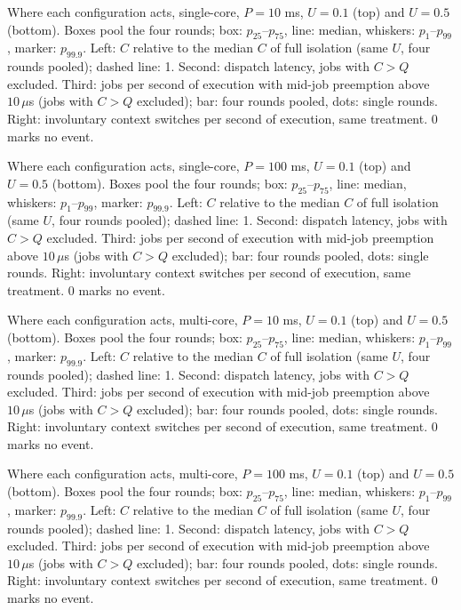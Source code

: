 \caption{Where each configuration acts, single-core, $P = 10$ ms, $U = 0.1$ (top) and $U = 0.5$ (bottom). Boxes pool the four rounds; box: $p_{25}$--$p_{75}$, line: median, whiskers: $p_1$--$p_{99}$, marker: $p_{99.9}$. Left: $C$ relative to the median $C$ of full isolation (same $U$, four rounds pooled); dashed line: 1. Second: dispatch latency, jobs with $C > Q$ excluded. Third: jobs per second of execution with mid-job preemption above $10\,\mu$s (jobs with $C > Q$ excluded); bar: four rounds pooled, dots: single rounds. Right: involuntary context switches per second of execution, same treatment. 0 marks no event.}

\caption{Where each configuration acts, single-core, $P = 100$ ms, $U = 0.1$ (top) and $U = 0.5$ (bottom). Boxes pool the four rounds; box: $p_{25}$--$p_{75}$, line: median, whiskers: $p_1$--$p_{99}$, marker: $p_{99.9}$. Left: $C$ relative to the median $C$ of full isolation (same $U$, four rounds pooled); dashed line: 1. Second: dispatch latency, jobs with $C > Q$ excluded. Third: jobs per second of execution with mid-job preemption above $10\,\mu$s (jobs with $C > Q$ excluded); bar: four rounds pooled, dots: single rounds. Right: involuntary context switches per second of execution, same treatment. 0 marks no event.}

\caption{Where each configuration acts, multi-core, $P = 10$ ms, $U = 0.1$ (top) and $U = 0.5$ (bottom). Boxes pool the four rounds; box: $p_{25}$--$p_{75}$, line: median, whiskers: $p_1$--$p_{99}$, marker: $p_{99.9}$. Left: $C$ relative to the median $C$ of full isolation (same $U$, four rounds pooled); dashed line: 1. Second: dispatch latency, jobs with $C > Q$ excluded. Third: jobs per second of execution with mid-job preemption above $10\,\mu$s (jobs with $C > Q$ excluded); bar: four rounds pooled, dots: single rounds. Right: involuntary context switches per second of execution, same treatment. 0 marks no event.}

\caption{Where each configuration acts, multi-core, $P = 100$ ms, $U = 0.1$ (top) and $U = 0.5$ (bottom). Boxes pool the four rounds; box: $p_{25}$--$p_{75}$, line: median, whiskers: $p_1$--$p_{99}$, marker: $p_{99.9}$. Left: $C$ relative to the median $C$ of full isolation (same $U$, four rounds pooled); dashed line: 1. Second: dispatch latency, jobs with $C > Q$ excluded. Third: jobs per second of execution with mid-job preemption above $10\,\mu$s (jobs with $C > Q$ excluded); bar: four rounds pooled, dots: single rounds. Right: involuntary context switches per second of execution, same treatment. 0 marks no event.}
